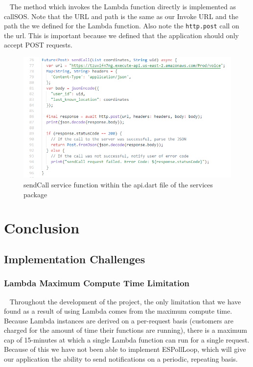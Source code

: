 \documentclass[10pt, a4paper]{article}
\begin{document}
\par ~ The method which invokes the Lambda function directly is implemented as callSOS. Note that the URL and path is the same as our Invoke URL and the path the we defined for the Lambda function. Also note the \texttt{http.post} call on the url. This is important because we defined that the application should only accept POST requests.
\begin{figure}[H]
\begin{center}
  \includegraphics[scale=1]{code-screenshots/send-call.PNG}
  \caption{sendCall service function within the api.dart file of the services package}
\end{center}
\end{figure}




\section{Conclusion}
\subsection{Implementation Challenges}
\subsubsection{Lambda Maximum Compute Time Limitation}
\par ~ Throughout the development of the project, the only limitation that we have found as a result of using Lambda comes from the maximum compute time. Because Lambda instances are derived on a per-request basis (customers are charged for the amount of time their functions are running), there is a maximum cap of 15-minutes at which a single Lambda function can run for a single request. Because of this we have not been able to implement ESPollLoop, which will give our application the ability to send notifications on a periodic, repeating basis.
\end{document}
